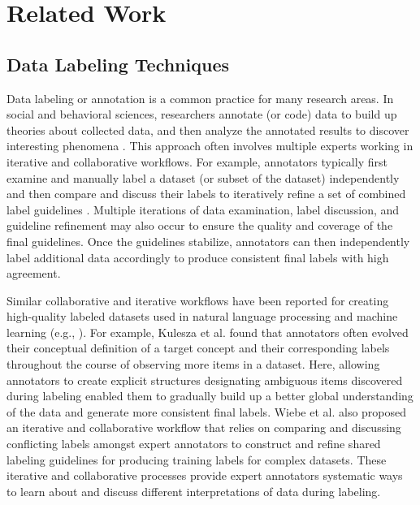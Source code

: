 \section{Related Work}

\subsection{Data Labeling Techniques}

Data labeling or annotation is a common practice for many research areas. In social and behavioral sciences, researchers annotate (or code) data to build up theories about collected data, and then analyze the annotated results to discover interesting phenomena \cite{strauss1998basics}. This approach often involves multiple experts working in iterative and collaborative workflows. For example, annotators typically first examine and manually label a dataset (or subset of the dataset) independently and then compare and discuss their labels to iteratively refine a set of combined label guidelines \cite{macqueen1998codebook, weston2001analyzing}. Multiple iterations of data examination, label discussion, and guideline refinement may also occur to ensure the quality and coverage of the final guidelines. Once the guidelines stabilize, annotators can then independently label additional data accordingly to produce consistent final labels with high agreement.

Similar collaborative and iterative workflows have been reported for creating high-quality labeled datasets used in natural language processing and machine learning (e.g., \cite{marcus1993building, wiebe1999development, kulesza2014structured}). For example, Kulesza et al. \cite{kulesza2014structured} found that annotators often evolved their conceptual definition of a target concept and their corresponding labels throughout the course of observing more items in a dataset. Here, allowing annotators to create explicit structures designating ambiguous items discovered during labeling enabled them to gradually build up a better global understanding of the data and generate more consistent final labels. Wiebe et al. \cite{wiebe1999development} also proposed an iterative and collaborative workflow that relies on comparing and discussing conflicting labels amongst expert annotators to construct and refine shared labeling guidelines for producing training labels for complex datasets. 
These iterative and collaborative processes provide expert annotators systematic ways to learn about and discuss different interpretations of data during labeling. %

